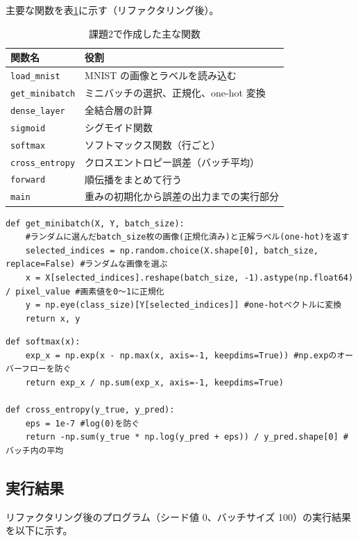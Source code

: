 \documentclass[a4paper,11pt]{ltjsarticle}
\begin{document}
主要な関数を表\ref{tab:func2}に示す（リファクタリング後）。
\begin{table}[H]
  \centering
  \caption{課題2で作成した主な関数}
  \label{tab:func2}
  \begin{tabular}{ll}
    \toprule
    関数名 & 役割 \\
    \midrule
    \texttt{load\_mnist}    & MNIST の画像とラベルを読み込む \\
    \texttt{get\_minibatch} & ミニバッチの選択、正規化、one-hot 変換 \\
    \texttt{dense\_layer}   & 全結合層の計算 \\
    \texttt{sigmoid}        & シグモイド関数 \\
    \texttt{softmax}        & ソフトマックス関数（行ごと） \\
    \texttt{cross\_entropy} & クロスエントロピー誤差（バッチ平均） \\
    \texttt{forward}        & 順伝播をまとめて行う \\
    \texttt{main}           & 重みの初期化から誤差の出力までの実行部分 \\
    \bottomrule
  \end{tabular}
\end{table}

\begin{lstlisting}[caption={ミニバッチの取得とone-hotベクトルへの変換}, label=lst:batch]
def get_minibatch(X, Y, batch_size):
    #ランダムに選んだbatch_size枚の画像(正規化済み)と正解ラベル(one-hot)を返す
    selected_indices = np.random.choice(X.shape[0], batch_size, replace=False) #ランダムな画像を選ぶ
    x = X[selected_indices].reshape(batch_size, -1).astype(np.float64) / pixel_value #画素値を0〜1に正規化
    y = np.eye(class_size)[Y[selected_indices]] #one-hotベクトルに変換
    return x, y
\end{lstlisting}

\begin{lstlisting}[caption={ミニバッチ対応のソフトマックス関数とクロスエントロピー誤差}, label=lst:ce]
def softmax(x):
    exp_x = np.exp(x - np.max(x, axis=-1, keepdims=True)) #np.expのオーバーフローを防ぐ
    return exp_x / np.sum(exp_x, axis=-1, keepdims=True)

def cross_entropy(y_true, y_pred):
    eps = 1e-7 #log(0)を防ぐ
    return -np.sum(y_true * np.log(y_pred + eps)) / y_pred.shape[0] #バッチ内の平均
\end{lstlisting}

\subsection{実行結果}
リファクタリング後のプログラム（シード値 0、バッチサイズ 100）の実行結果を以下に示す。
\end{document}
